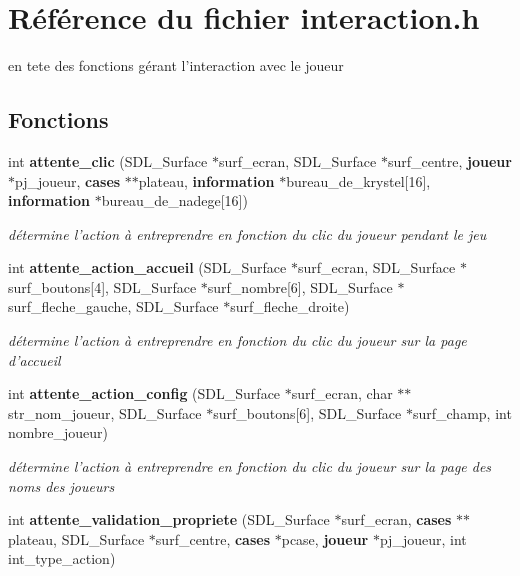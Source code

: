 \section{R\'{e}f\'{e}rence du fichier interaction.h}
\label{interaction_8h}
en tete des fonctions g\'{e}rant l'interaction avec le joueur 

\subsection*{Fonctions}
\begin{CompactItemize}
\item 
int {\bf attente\_\-clic} (SDL\_\-Surface $\ast$surf\_\-ecran, SDL\_\-Surface $\ast$surf\_\-centre, {\bf joueur} $\ast$pj\_\-joueur, {\bf cases} $\ast$$\ast$plateau, {\bf information} $\ast$bureau\_\-de\_\-krystel[16], {\bf information} $\ast$bureau\_\-de\_\-nadege[16])
\begin{CompactList}\small\item\em d\'{e}termine l'action \`{a} entreprendre en fonction du clic du joueur pendant le jeu \item\end{CompactList}\item 
int {\bf attente\_\-action\_\-accueil} (SDL\_\-Surface $\ast$surf\_\-ecran, SDL\_\-Surface $\ast$surf\_\-boutons[4], SDL\_\-Surface $\ast$surf\_\-nombre[6], SDL\_\-Surface $\ast$surf\_\-fleche\_\-gauche, SDL\_\-Surface $\ast$surf\_\-fleche\_\-droite)
\begin{CompactList}\small\item\em d\'{e}termine l'action \`{a} entreprendre en fonction du clic du joueur sur la page d'accueil \item\end{CompactList}\item 
int {\bf attente\_\-action\_\-config} (SDL\_\-Surface $\ast$surf\_\-ecran, char $\ast$$\ast$str\_\-nom\_\-joueur, SDL\_\-Surface $\ast$surf\_\-boutons[6], SDL\_\-Surface $\ast$surf\_\-champ, int nombre\_\-joueur)
\begin{CompactList}\small\item\em d\'{e}termine l'action \`{a} entreprendre en fonction du clic du joueur sur la page des noms des joueurs \item\end{CompactList}\item 
int {\bf attente\_\-validation\_\-propriete} (SDL\_\-Surface $\ast$surf\_\-ecran, {\bf cases} $\ast$$\ast$plateau, SDL\_\-Surface $\ast$surf\_\-centre, {\bf cases} $\ast$pcase, {\bf joueur} $\ast$pj\_\-joueur, int int\_\-type\_\-action)
$$
\end{CompactItemize}
